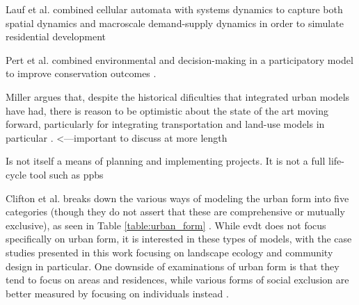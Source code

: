 Lauf et al. combined cellular automata with systems dynamics to capture both spatial dynamics and macroscale demand-supply dynamics in order to simulate residential development \cite{laufUncoveringLanduseDynamics2012}

Pert et al. combined environmental and decision-making in a participatory model to improve conservation outcomes \cite{pertParticipatoryDevelopmentNew2013}. 

Miller argues that, despite the historical dificulties that integrated urban models have had, there is reason to be optimistic about the state of the art moving forward, particularly for integrating transportation and land-use models in particular \cite{millerIntegratedUrbanModeling2018}. <---important to discuss at more length

Is not itself a means of planning and implementing projects. It is not a full life-cycle tool such as \ac{ppbs} \cite{hatryCriteriaEvaluationPlanning1972}

Clifton et al. breaks down the various ways of modeling the urban form into five categories (though they do not assert that these are comprehensive or mutually exclusive), as seen in Table \ref{table:urban_form} \cite{cliftonQuantitativeAnalysisUrban2008}. While \ac{evdt} does not focus specifically on urban form, it is interested in these types of models, with the case studies presented in this work focusing on landscape ecology and community design in particular. One downside of examinations of urban form is that they tend to focus on areas and residences, while various forms of social exclusion are better measured by focusing on individuals instead \cite{scottRoleUrbanForm2008}.

